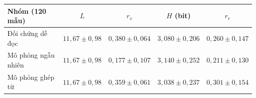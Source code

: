 \begin{tabularx}{\textwidth}{|>{\raggedright\arraybackslash}X|c|c|c|c|}
\hline
\rowcolor{LightCyan}
\textbf{Nhóm (120 mẫu)} & \textbf{$L$} & \textbf{$r_v$} & \textbf{$H$ (bit)} & \textbf{$r_r$} \\
\hline
Đối chứng dễ đọc & $11{,}67\pm 0{,}98$ & $0{,}380\pm 0{,}064$ & $3{,}080\pm 0{,}206$ & $0{,}260\pm 0{,}147$ \\ \hline
Mô phỏng ngẫu nhiên & $11{,}67\pm 0{,}98$ & $0{,}177\pm 0{,}107$ & $3{,}140\pm 0{,}252$ & $0{,}211\pm 0{,}130$ \\ \hline
Mô phỏng ghép từ & $11{,}67\pm 0{,}98$ & $0{,}359\pm 0{,}061$ & $3{,}038\pm 0{,}237$ & $0{,}301\pm 0{,}154$ \\ \hline
\end{tabularx}
